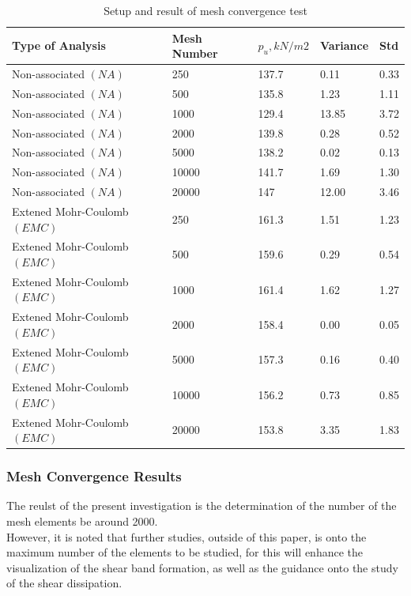 \documentclass[a4paper, nobind]{templates/ociamthesis}
\begin{document}
\begin{table}[H]
\centering
{%
\begin{tabular}{@{}lllll@{}}
\toprule
Type of Analysis           & Mesh Number & $p_u,kN/m2$ & Variance & Std  \\ \midrule
Non-associated $(NA)$        & 250         & 137.7       & 0.11     & 0.33 \\
Non-associated $(NA)$        & 500         & 135.8       & 1.23     & 1.11 \\
Non-associated $(NA)$        & 1000        & 129.4       & 13.85    & 3.72 \\
Non-associated $(NA)$        & 2000        & 139.8       & 0.28     & 0.52 \\
Non-associated $(NA)$        & 5000        & 138.2       & 0.02     & 0.13 \\
Non-associated $(NA)$        & 10000       & 141.7       & 1.69     & 1.30 \\
Non-associated $(NA)$        & 20000       & 147         & 12.00    & 3.46 \\
Extened Mohr-Coulomb $(EMC)$ & 250         & 161.3       & 1.51     & 1.23 \\
Extened Mohr-Coulomb $(EMC)$ & 500         & 159.6       & 0.29     & 0.54 \\
Extened Mohr-Coulomb $(EMC)$ & 1000        & 161.4       & 1.62     & 1.27 \\
Extened Mohr-Coulomb $(EMC)$ & 2000        & 158.4       & 0.00     & 0.05 \\
Extened Mohr-Coulomb $(EMC)$ & 5000        & 157.3       & 0.16     & 0.40 \\
Extened Mohr-Coulomb $(EMC)$ & 10000       & 156.2       & 0.73     & 0.85 \\
Extened Mohr-Coulomb $(EMC)$ & 20000       & 153.8       & 3.35     & 1.83 \\ \bottomrule
\end{tabular}%
}
\caption{Setup and result of mesh convergence test}
\label{tab:Setup and result of mesh convergence test}
\end{table}

\hypertarget{mesh-convergence-results}{%
\subsubsection{Mesh Convergence Results}\label{mesh-convergence-results}}

The reulst of the present investigation is the determination of the number of the mesh elements be around 2000.\\
However, it is noted that further studies, outside of this paper, is onto the maximum number of the elements to be studied, for this will enhance the visualization of the shear band formation, as well as the guidance onto the study of the shear dissipation.
\end{document}
